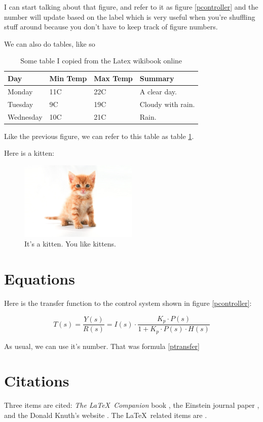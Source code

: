 \documentclass[12pt]{article}
\begin{document}
	I can start talking about that figure, and refer to it as figure \ref{pcontroller} and the number will update based on the label which is very useful when you're shuffling stuff around because you don't have to keep track of figure numbers.

	We can also do tables, like so

	\begin{center}
		\begin{table}[!ht]
			\begin{tabular}{ | l | l | l | p{5cm} |}
			\hline
			Day & Min Temp & Max Temp & Summary \\ \hline
			Monday & 11C & 22C & A clear day. \\ 	\hline
			Tuesday & 9C & 19C & Cloudy with rain.\\ \hline
			Wednesday & 10C & 21C & Rain. \\
			\hline
			\end{tabular}
			\caption{Some table I copied from the Latex wikibook online}
			\label{shittytable}
		\end{table}
	\end{center}

	Like the previous figure, we can refer to this table as table \ref{shittytable}.

	Here is a kitten:

	\begin{figure}[!ht]
		\label{kitten}
		\centering
		\includegraphics[width=0.5\textwidth]{kitten}
		\caption{It's a kitten. You like kittens.}
	\end{figure}

	\section{Equations}

	Here is the transfer function to the control system shown in figure \ref{pcontroller}:

	\begin{equation}
		\label{ptransfer}
		T(s)=\frac{Y(s)}{R(s)}=I(s) \cdot \frac{K_p \cdot P(s)}{1 + K_p \cdot P(s) \cdot H(s)}
	\end{equation}

	As usual, we can use it's number. That was formula \eqref{ptransfer}

  \section{Citations}

  Three items are cited: \textit{The \LaTeX\ Companion} book \cite{latexcompanion}, the Einstein journal paper \cite{einstein}, and the Donald Knuth's website \cite{knuthwebsite}. The \LaTeX\ related items are \cite{latexcompanion,knuthwebsite}.

\end{document}
